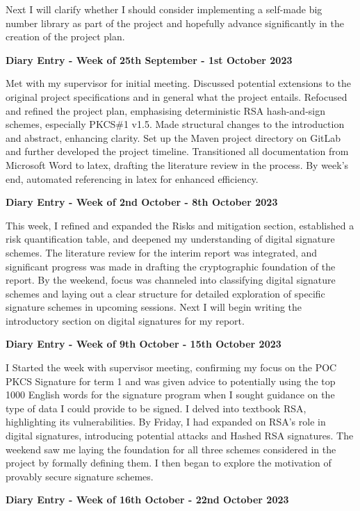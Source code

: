 \documentclass[]{final_report}
\theoremstyle{definition}
\begin{document}
Next I will clarify whether I should consider implementing a self-made big number library as part of
the project and hopefully advance significantly in the creation of the project plan.

\textbf{Diary Entry - Week of 25th September - 1st October 2023}

Met with my supervisor for initial meeting. Discussed potential extensions to the original project
specifications and in general what the project entails. Refocused and refined the project plan,
emphasising deterministic RSA hash-and-sign schemes, especially PKCS\#1 v1.5. Made structural changes
to the introduction and abstract, enhancing clarity. Set up the Maven project directory on GitLab
and further developed the project timeline. Transitioned all documentation from Microsoft Word to
latex, drafting the literature review in the process. By week's end, automated referencing in latex
for enhanced efficiency.

\textbf{Diary Entry - Week of 2nd October - 8th October 2023}

This week, I refined and expanded the Risks and mitigation section, established a risk
quantification table, and deepened my understanding of digital signature schemes. The literature
review for the interim report was integrated, and significant progress was made in drafting the
cryptographic foundation of the report. By the weekend, focus was channeled into classifying digital
signature schemes and laying out a clear structure for detailed exploration of specific signature
schemes in upcoming sessions. Next I will begin writing the introductory section on digital
signatures for my report.

\textbf{Diary Entry - Week of 9th October - 15th October 2023}

I Started the week with supervisor meeting, confirming my focus on the POC PKCS Signature for term 1
and was given advice to potentially using the top 1000 English words for the signature program when
I sought guidance on the type of data I could provide to be signed. I delved into textbook RSA,
highlighting its vulnerabilities. By Friday, I had expanded on RSA's role in digital signatures,
introducing potential attacks and Hashed RSA signatures. The weekend saw me laying the foundation
for all three schemes considered in the project by formally defining them. I then began to explore
the motivation of provably secure signature schemes.

\textbf{Diary Entry - Week of 16th October - 22nd October 2023}
\end{document}
